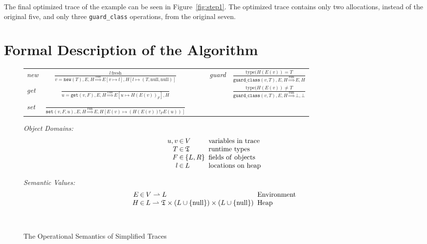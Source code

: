 \documentclass{sigplanconf}
\begin{document}
The final optimized trace of the example can be seen in Figure~\ref{fig:step1}.
The optimized trace contains only two allocations, instead of the original five,
and only three \texttt{guard\_class} operations, from the original seven.

\section{Formal Description of the Algorithm}
\label{sec:formal}


\begin{figure}
\begin{center}
\begin{tabular}{lcccc}
\emph{new} & ${\displaystyle \frac{l\,\mathrm{fresh}}{v=\mathtt{new}(T),E,H\overset{\mathrm{run}}{\Longrightarrow}E\left[v\mapsto l\right],H\left[l\mapsto\left(T,\mathrm{null},\mathrm{null}\right)\right]}}$ & ~~~ & \emph{guard} & ${\displaystyle \frac{\mathrm{type}(H(E(v))=T}{\mathtt{guard\_class}(v,T),E,H\overset{\mathrm{run}}{\Longrightarrow}E,H}}$\tabularnewline[3em]
\emph{get} & ${\displaystyle \frac{\,}{u=\mathtt{get}(v,F),E,H\overset{\mathrm{run}}{\Longrightarrow}E\left[u\mapsto H\left(E\left(v\right)\right)_{F}\right],H}}$ & ~~~ &  & ${\displaystyle \frac{\mathrm{type}(H(E(v))\neq T}{\mathtt{guard\_class}(v,T),E,H\overset{\mathrm{run}}{\Longrightarrow}\bot,\bot}}$\tabularnewline[3em]
\emph{set} & ${\displaystyle \frac{\,}{\mathtt{set}\left(v,F,u\right),E,H\overset{\mathrm{run}}{\Longrightarrow}E,H\left[E\left(v\right)\mapsto\left(H\left(E\left(v\right)\right)!_{F}E(u)\right)\right]}}$ & ~~~ &  & \tabularnewline[4em]
\end{tabular}

\begin{minipage}[b]{7 cm}
\emph{Object Domains:}
$$\setlength\arraycolsep{0.1em}
 \begin{array}{rcll}
    u,v & \in & V & \mathrm{\ variables\ in\ trace}\\
    T & \in & \mathfrak{T} & \mathrm{\ runtime\ types}\\
    F & \in & \left\{ L,R\right\} & \mathrm{\ fields\ of\ objects}\\
    l & \in & L & \mathrm{\ locations\ on\ heap}
 \end{array}
$$
\end{minipage}
\begin{minipage}[b]{5 cm}
\emph{Semantic Values:}
$$\setlength\arraycolsep{0.1em}
 \begin{array}{rcll}
    E & \in & V\rightharpoonup L & \mathrm{\ Environment}\\
    H & \in & L\rightharpoonup\mathfrak{T}\times(L\cup \{ \mathrm{null} \})\times (L\cup \{ \mathrm{null}\} ) & \mathrm{\ Heap}\\
    \\
    \\
 \end{array}
$$
\end{minipage}
\end{center}
\caption{The Operational Semantics of Simplified Traces}
\label{fig:semantics}
\end{figure}
\end{document}
